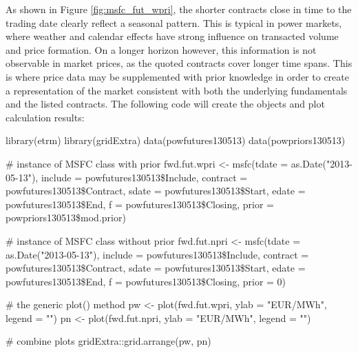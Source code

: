 As shown in Figure \ref{fig:msfc_fut_wpri}, the shorter contracts close in time to the trading date clearly reflect a seasonal pattern. This is typical in power markets, where weather and calendar effects have strong influence on transacted volume and price formation. On a longer horizon however, this information is not observable in market prices, as the quoted contracts cover longer time spans. This is where price data may be supplemented with prior knowledge in order to create a representation of the market consistent with both the underlying fundamentals and the listed contracts. The following code will create the  objects and plot calculation results:

\begin{example*}
library(etrm)
library(gridExtra)
data(powfutures130513)
data(powpriors130513)

# instance of MSFC class with prior
fwd.fut.wpri <- msfc(tdate = as.Date("2013-05-13"),
                     include = powfutures130513\$Include,
                     contract = powfutures130513\$Contract,
                     sdate = powfutures130513\$Start,
                     edate = powfutures130513\$End,
                     f = powfutures130513\$Closing,
                     prior = powpriors130513\$mod.prior)

# instance of MSFC class without prior
fwd.fut.npri <- msfc(tdate = as.Date("2013-05-13"),
                     include = powfutures130513\$Include,
                     contract = powfutures130513\$Contract,
                     sdate = powfutures130513\$Start,
                     edate = powfutures130513\$End,
                     f = powfutures130513\$Closing,
                     prior = 0)
                     
                     
                     
                     
                     
                     
                     
# the generic plot() method
pw <- plot(fwd.fut.wpri, ylab = "EUR/MWh", legend = "")
pn <- plot(fwd.fut.npri, ylab = "EUR/MWh", legend = "")

# combine plots
gridExtra::grid.arrange(pw, pn)
\end{example*}


